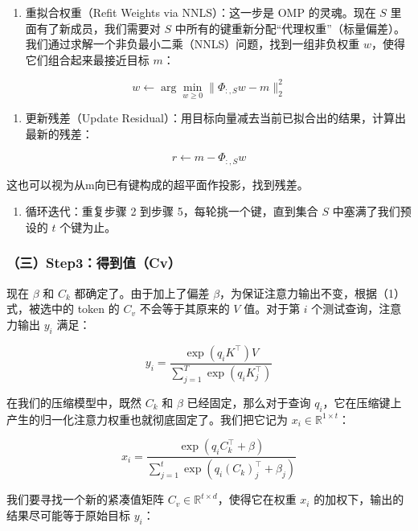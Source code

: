 \begin{enumerate}
\def\labelenumi{\arabic{enumi}.}
\setcounter{enumi}{3}
\tightlist
\item
  重拟合权重（Refit Weights via NNLS）：这一步是 OMP 的灵魂。现在 \(S\) 里面有了新成员，我们需要对 \(S\) 中所有的键重新分配``代理权重''（标量偏差）。我们通过求解一个非负最小二乘（NNLS）问题，找到一组非负权重 \(w\)，使得它们组合起来最接近目标 \(m\)：
\end{enumerate}

\[
w \leftarrow \arg\min_{w \ge 0}\|\Phi_{:,S}w - m\|_2^2
\]

\begin{enumerate}
\def\labelenumi{\arabic{enumi}.}
\setcounter{enumi}{4}
\tightlist
\item
  更新残差（Update Residual）：用目标向量减去当前已拟合出的结果，计算出最新的残差：
\end{enumerate}

\[
r \leftarrow m - \Phi_{:,S}w
\]

这也可以视为从m向已有键构成的超平面作投影，找到残差。

\begin{enumerate}
\def\labelenumi{\arabic{enumi}.}
\setcounter{enumi}{5}
\tightlist
\item
  循环迭代：重复步骤 2 到步骤 5，每轮挑一个键，直到集合 \(S\) 中塞满了我们预设的 \(t\) 个键为止。
\end{enumerate}

\hypertarget{ux4e09step3ux5f97ux5230ux503ccv}{%
\subsubsection{（三）Step3：得到值（Cv）}\label{ux4e09step3ux5f97ux5230ux503ccv}}

现在 \(\beta\) 和 \(C_k\) 都确定了。由于加上了偏差 \(\beta\)，为保证注意力输出不变，根据（1）式，被选中的 token 的 \(C_v\) 不会等于其原来的 \(V\) 值。对于第 \(i\) 个测试查询，注意力输出 \(y_i\) 满足：

\[
y_i =
\frac{\exp(q_i K^\top)V}{\sum_{j=1}^{T}\exp(q_i K_j^\top)}
\]

在我们的压缩模型中，既然 \(C_k\) 和 \(\beta\) 已经固定，那么对于查询 \(q_i\)，它在压缩键上产生的归一化注意力权重也就彻底固定了。我们把它记为 \(x_i \in \mathbb{R}^{1 \times t}\)：

\[
x_i =
\frac{\exp(q_i C_k^\top + \beta)}{\sum_{j=1}^{t}\exp(q_i (C_k)_j^\top + \beta_j)}
\]

我们要寻找一个新的紧凑值矩阵 \(C_v \in \mathbb{R}^{t \times d}\)，使得它在权重 \(x_i\) 的加权下，输出的结果尽可能等于原始目标 \(y_i\)：

